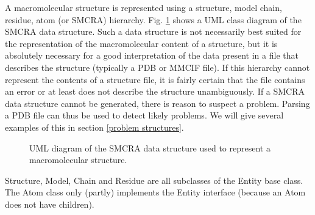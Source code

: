 \documentclass{report}
\begin{document}
A macromolecular structure is represented using a structure, model chain,
residue, atom (or SMCRA) hierarchy. Fig. \ref{SMCRA UML diagram} shows a UML
class diagram of the SMCRA data structure.  Such a data structure is not
necessarily best suited for the representation of the macromolecular content of
a structure, but it is absolutely necessary for a good interpretation of the
data present in a file that describes the structure (typically a PDB or MMCIF
file). If this hierarchy cannot represent the contents of a structure file, it
is fairly certain that the file contains an error or at least does not describe
the structure unambiguously. If a SMCRA data structure cannot be generated,
there is reason to suspect a problem. Parsing a PDB file can thus be used to
detect likely problems. We will give several examples of this in section
\ref{problem structures}. 

\begin{figure}
{\par\centering
{} \par}
\caption{\label{SMCRA UML diagram}UML diagram of the SMCRA data structure used to represent
a macromolecular structure.}
\end{figure}

Structure, Model, Chain and Residue are all subclasses of the Entity base class.
The Atom class only (partly) implements the Entity interface (because an Atom
does not have children). 
\end{document}
